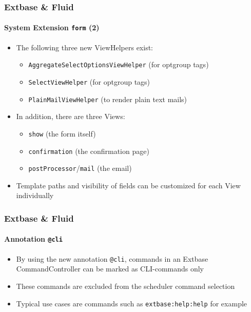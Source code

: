 \begin{frame}[fragile]
	\frametitle{Extbase \& Fluid}
	\framesubtitle{System Extension \texttt{form} (2)}

	\begin{itemize}

		\item The following three new ViewHelpers exist:

			\begin{itemize}
				\item \texttt{AggregateSelectOptionsViewHelper} (for optgroup tags)
				\item \texttt{SelectViewHelper} (for optgroup tags)
				\item \texttt{PlainMailViewHelper} (to render plain text mails)
			\end{itemize}

		\item In addition, there are three Views:

			\begin{itemize}
				\item \texttt{show} (the form itself)
				\item \texttt{confirmation} (the confirmation page)
				\item \texttt{postProcessor}/\texttt{mail} (the email)
			\end{itemize}

		\item Template paths and visibility of fields can be customized
			for each View individually

	\end{itemize}

\end{frame}


\begin{frame}[fragile]
	\frametitle{Extbase \& Fluid}
	\framesubtitle{Annotation \texttt{@cli}}

	\begin{itemize}

		\item By using the new annotation \texttt{@cli}, commands in an Extbase
			CommandController can be marked as CLI-commands only

		\item These commands are excluded from the scheduler command selection

		\item Typical use cases are commands such as \texttt{extbase:help:help} for example

	\end{itemize}

\end{frame}

